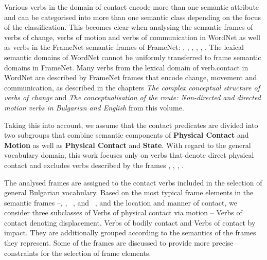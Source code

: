 \documentclass[output=paper,colorlinks,citecolor=brown]{langscibook}
\begin{document}
Various verbs in the domain of contact encode more than one semantic attribute and can be categorised into more than one semantic class depending on the focus of the classification. This becomes clear when analysing the semantic frames of verbs of change, verbs of motion and verbs of communication in WordNet as well as verbs in the FrameNet semantic frames of FrameNet: , , , , , . The lexical semantic domains of WordNet cannot be uniformly transferred to frame semantic domains in FrameNet. Many verbs from the lexical domain of verb.contact in WordNet are described by FrameNet frames that encode change, movement and communication, as described in the chapters \textit{The complex conceptual structure of verbs of change} and \textit{The conceptualisation of the route: Non-directed and directed motion verbs in Bulgarian and English} from this volume.

Taking this into account, we assume that the contact predicates are divided into two subgroups that combine semantic components of \textbf{Physical Contact} and \textbf{Motion} as well as \textbf{Physical Contact} and \textbf{State}. With regard to the general vocabulary domain, this work focuses only on verbs that denote direct physical contact and excludes verbs described by the frames , , , .

The analysed frames are assigned to the contact verbs included in the selection of general Bulgarian vocabulary.  Based on the most typical frame elements in the semantic frames --, ,  \ , and  \ , and the location and manner of contact, we consider three subclasses of Verbs of physical contact via motion -- Verbs of contact denoting displacement, Verbs of bodily contact and Verbs of contact by impact. They are additionally grouped according to the semantics of the frames they represent. Some of the frames are discussed to provide more precise constraints for the selection of frame elements.
\end{document}
